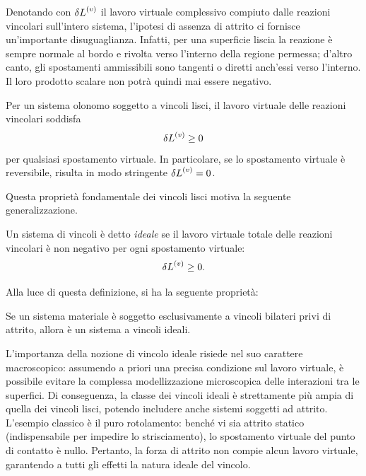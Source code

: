 Denotando con $\var{L}^{(v)}$ il lavoro virtuale complessivo compiuto dalle reazioni vincolari sull'intero sistema, l'ipotesi di assenza di attrito ci fornisce un'importante disuguaglianza. Infatti, per una superficie liscia la reazione è sempre normale al bordo e rivolta verso l'interno della regione permessa; d'altro canto, gli spostamenti ammissibili sono tangenti o diretti anch'essi verso l'interno. Il loro prodotto scalare non potrà quindi mai essere negativo.

\begin{proposition}
    Per un sistema olonomo soggetto a vincoli lisci, il lavoro virtuale delle reazioni vincolari soddisfa
    \begin{equation*}
        \var{L}^{(v)} \geq 0
    \end{equation*}
    per qualsiasi spostamento virtuale. In particolare, se lo spostamento virtuale è reversibile, risulta in modo stringente $\var{L}^{(v)} = 0$.
\end{proposition}

Questa proprietà fondamentale dei vincoli lisci motiva la seguente generalizzazione.
\begin{definition}
    Un sistema di vincoli è detto \emph{ideale} se il lavoro virtuale totale delle reazioni vincolari è non negativo per ogni spostamento virtuale:
    \begin{equation*}
        \var{L}^{(v)} \geq 0.
    \end{equation*}
\end{definition}

Alla luce di questa definizione, si ha la seguente proprietà:

\begin{proposition}
    Se un sistema materiale è soggetto esclusivamente a vincoli bilateri privi di attrito, allora è un sistema a vincoli ideali.
\end{proposition}

L'importanza della nozione di vincolo ideale risiede nel suo carattere macroscopico: assumendo a priori una precisa condizione sul lavoro virtuale, è possibile evitare la complessa modellizzazione microscopica delle interazioni tra le superfici. Di conseguenza, la classe dei vincoli ideali è strettamente più ampia di quella dei vincoli lisci, potendo includere anche sistemi soggetti ad attrito. L'esempio classico è il puro rotolamento: benché vi sia attrito statico (indispensabile per impedire lo strisciamento), lo spostamento virtuale del punto di contatto è nullo. Pertanto, la forza di attrito non compie alcun lavoro virtuale, garantendo a tutti gli effetti la natura ideale del vincolo.

